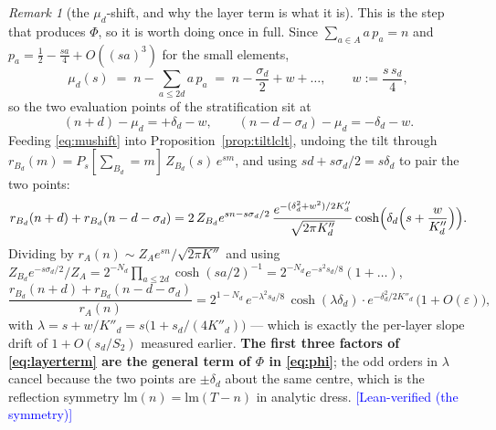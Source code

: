 \documentclass[11pt,a4paper]{article}
\theoremstyle{plain}
\theoremstyle{definition}
\theoremstyle{remark}
\newtheorem{remark}[theorem]{Remark}
\newcommand{\lm}{\mathrm{lm}}
\newcommand{\STATUS}[1]{\textcolor{blue}{\textsf{[#1]}}}
\begin{document}
\begin{remark}[the $\mu_d$-shift, and why the layer term is what it is]\label{rem:mushift}
This is the step that produces $\Phi$, so it is worth doing once in full. Since
$\sum_{a\in A}a\,p_a=n$ and $p_a=\tfrac12-\tfrac{sa}{4}+O((sa)^{3})$ for the small elements,
\[
  \mu_d(s)\;=\;n-\!\!\sum_{a\le 2d}\!\!a\,p_a\;=\;n-\frac{\sigma_d}{2}+w+\dots,
  \qquad w:=\frac{s\,s_d}{4},
\]
so the two evaluation points of the stratification sit at
\begin{equation}\label{eq:mushift}
  (n+d)-\mu_d=+\delta_d-w,
  \qquad
  (n-d-\sigma_d)-\mu_d=-\delta_d-w .
\end{equation}
Feeding \eqref{eq:mushift} into Proposition~\ref{prop:tiltlclt}, undoing the tilt through
$r_{B_d}(m)=P_s[\sum_{B_d}=m]\,Z_{B_d}(s)\,e^{sm}$, and using
$sd+s\sigma_d/2=s\delta_d$ to pair the two points:
\[
  r_{B_d}(n+d)+r_{B_d}(n-d-\sigma_d)
  =2\,Z_{B_d}e^{sn-s\sigma_d/2}\,
   \frac{e^{-(\delta_d^{2}+w^{2})/2K''_d}}{\sqrt{2\pi K''_d}}
   \cosh\Bigl(\delta_d\Bigl(s+\frac{w}{K''_d}\Bigr)\Bigr).
\]
Dividing by $r_A(n)\sim Z_Ae^{sn}/\sqrt{2\pi K''}$ and using
$Z_{B_d}e^{-s\sigma_d/2}/Z_A=2^{-N_d}\prod_{a\le2d}\cosh(sa/2)^{-1}
=2^{-N_d}e^{-s^{2}s_d/8}(1+\dots)$,
\begin{equation}\label{eq:layerterm}
  \frac{r_{B_d}(n+d)+r_{B_d}(n-d-\sigma_d)}{r_A(n)}
  =2^{1-N_d}\,e^{-\lambda^{2}s_d/8}\,\cosh(\lambda\delta_d)\cdot
   e^{-\delta_d^{2}/2K''_d}\,\bigl(1+O(\varepsilon)\bigr),
\end{equation}
with $\lambda=s+w/K''_d=s\bigl(1+s_d/(4K''_d)\bigr)$ --- which is exactly the per-layer slope
drift of $1+O(s_d/S_2)$ measured earlier. \textbf{The first three factors of
\eqref{eq:layerterm} are the general term of $\Phi$ in \eqref{eq:phi}}; the odd orders in
$\lambda$ cancel because the two points are $\pm\delta_d$ about the same centre, which is the
reflection symmetry $\lm(n)=\lm(T-n)$ in analytic dress. \STATUS{Lean-verified (the symmetry)}
\end{remark}
\end{document}
